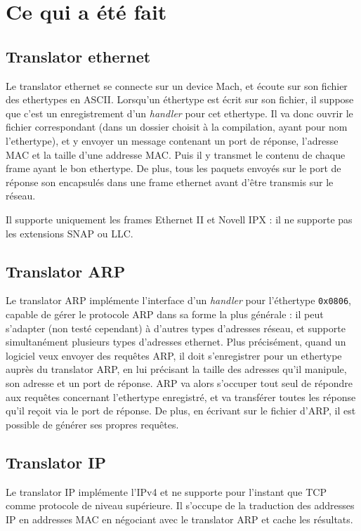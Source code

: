 \documentclass{article}
\begin{document}
\section{Ce qui a été fait}

\subsection{Translator ethernet}
Le translator ethernet se connecte sur un device Mach, et écoute sur son fichier
des ethertypes en ASCII. Lorsqu'un éthertype est écrit sur son fichier, il suppose
que c'est un enregistrement d'un \emph{handler} pour cet ethertype. Il va donc
ouvrir le fichier correspondant (dans un dossier choisit à la compilation, ayant
pour nom l'ethertype), et y envoyer un message contenant un port de réponse,
l'adresse MAC et la taille d'une addresse MAC. Puis il y transmet le contenu
de chaque frame ayant le bon ethertype. De plus, tous les paquets envoyés sur
le port de réponse son encapsulés dans une frame ethernet avant d'être transmis
sur le réseau.

Il supporte uniquement les frames Ethernet II et Novell IPX : il ne supporte pas
les extensions SNAP ou LLC.

\subsection{Translator ARP}
Le translator ARP implémente l'interface d'un \emph{handler} pour l'éthertype
\texttt{0x0806}, capable de gérer le protocole ARP dans sa forme la plus générale :
il peut s'adapter (non testé cependant) à d'autres types d'adresses réseau, et
supporte simultanément plusieurs types d'adresses ethernet. Plus précisément,
quand un logiciel veux envoyer des requêtes ARP, il doit s'enregistrer pour
un ethertype auprès du translator ARP, en lui précisant la taille des adresses
qu'il manipule, son adresse et un port de réponse. ARP va alors s'occuper tout
seul de répondre aux requêtes concernant l'ethertype enregistré, et va transférer
toutes les réponse qu'il reçoit via le port de réponse. De plus, en écrivant
sur le fichier d'ARP, il est possible de générer ses propres requêtes.

\subsection{Translator IP}
Le translator IP implémente l'IPv4 et ne supporte pour l'instant que TCP comme
protocole de niveau supérieure. Il s'occupe de la traduction des addresses IP
en addresses MAC en négociant avec le translator ARP et cache les résultats.
\end{document}
